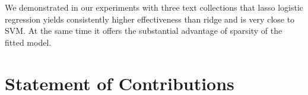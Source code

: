 \documentclass[conference]{IEEEtran}
\begin{document}
We demonstrated in our experiments with three text collections that lasso logistic regression yields consistently higher
effectiveness than ridge and is very close to SVM. At the
same time it offers the substantial advantage of sparsity of
the fitted model.



\section{Statement of Contributions}







%
\end{document}
